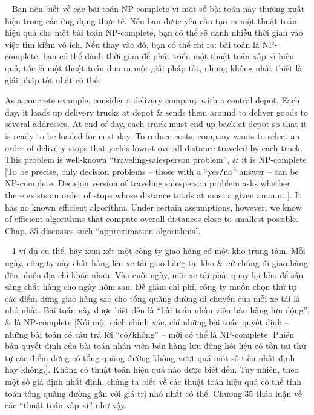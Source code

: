 \documentclass{article}
\begin{document}
\begin{itemize}
\begin{itemize}
\begin{itemize}
            -- Bạn nên biết về các bài toán NP-complete vì một số bài toán này thường xuất hiện trong các ứng dụng thực tế. Nếu bạn được yêu cầu tạo ra một thuật toán hiệu quả cho một bài toán NP-complete, bạn có thể sẽ dành nhiều thời gian vào việc tìm kiếm vô ích. Nếu thay vào đó, bạn có thể chỉ ra: bài toán là NP-complete, bạn có thể dành thời gian để phát triển một thuật toán xấp xỉ hiệu quả, tức là một thuật toán đưa ra một giải pháp tốt, nhưng không nhất thiết là giải pháp tốt nhất có thể.
            
            As a concrete example, consider a delivery company with a central depot. Each day, it loads up delivery trucks at depot \& sends them around to deliver goods to several addresses. At end of day, each truck must end up back at depot so that it is ready to be loaded for next day. To reduce costs, company wants to select an order of delivery stops that yields lowest overall distance traveled by each truck. This problem is well-known ``traveling-salesperson problem'', \& it is NP-complete [To be precise, only decision problems -- those with a ``yes{\tt/}no'' answer -- can be NP-complete. Decision version of traveling salesperson problem asks whether there exists an order of stops whose distance totals at most a given amount.]. It has no known efficient algorithm. Under certain assumptions, however, we know of efficient algorithms that compute overall distances close to smallest possible. Chap. 35 discusses such ``approximation algorithms''.
            
            -- 1 ví dụ cụ thể, hãy xem xét một công ty giao hàng có một kho trung tâm. Mỗi ngày, công ty này chất hàng lên xe tải giao hàng tại kho \& cử chúng đi giao hàng đến nhiều địa chỉ khác nhau. Vào cuối ngày, mỗi xe tải phải quay lại kho để sẵn sàng chất hàng cho ngày hôm sau. Để giảm chi phí, công ty muốn chọn thứ tự các điểm dừng giao hàng sao cho tổng quãng đường di chuyển của mỗi xe tải là nhỏ nhất. Bài toán này được biết đến là ``bài toán nhân viên bán hàng lưu động'', \& là NP-complete [Nói một cách chính xác, chỉ những bài toán quyết định -- những bài toán có câu trả lời ``có{\tt/}không'' -- mới có thể là NP-complete. Phiên bản quyết định của bài toán nhân viên bán hàng lưu động hỏi liệu có tồn tại thứ tự các điểm dừng có tổng quãng đường không vượt quá một số tiền nhất định hay không.]. Không có thuật toán hiệu quả nào được biết đến. Tuy nhiên, theo một số giả định nhất định, chúng ta biết về các thuật toán hiệu quả có thể tính toán tổng quãng đường gần với giá trị nhỏ nhất có thể. Chương 35 thảo luận về các ``thuật toán xấp xỉ'' như vậy.
            

\end{itemize}
\end{itemize}
\end{itemize}
\end{document}
